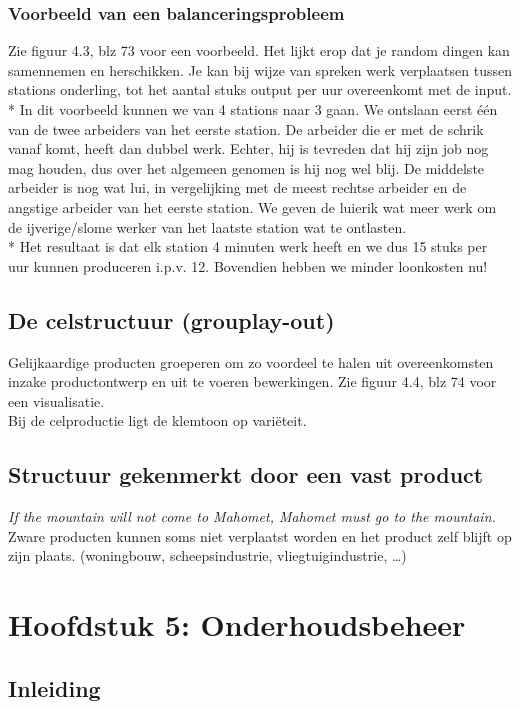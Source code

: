 \documentclass[12pt]{article}
\begin{document}
\subsubsection{Voorbeeld van een balanceringsprobleem}
Zie figuur 4.3, blz 73 voor een voorbeeld. Het lijkt erop dat je random dingen kan samennemen en herschikken. Je kan bij wijze van spreken werk verplaatsen tussen stations onderling, tot het aantal stuks output per uur overeenkomt met de input. \\*
In dit voorbeeld kunnen we van 4 stations naar 3 gaan. We ontslaan eerst \'e\'en van de twee arbeiders van het eerste station. De arbeider die er met de schrik vanaf komt, heeft dan dubbel werk. Echter, hij is tevreden dat hij zijn job nog mag houden, dus over het algemeen genomen is hij nog wel blij. De middelste arbeider is nog wat lui, in vergelijking met de meest rechtse arbeider en de angstige arbeider van het eerste station. We geven de luierik wat meer werk om de ijverige/slome werker van het laatste station wat te ontlasten.\\*
Het resultaat is dat elk station 4 minuten werk heeft en we dus 15 stuks per uur kunnen produceren i.p.v. 12. Bovendien hebben we minder loonkosten nu!
\subsection{De celstructuur (grouplay-out)}
Gelijkaardige producten groeperen om zo voordeel te halen uit overeenkomsten inzake productontwerp en uit te voeren bewerkingen. Zie figuur 4.4, blz 74 voor een visualisatie.\\
Bij de celproductie ligt de klemtoon op vari\"eteit.
\subsection{Structuur gekenmerkt door een vast product}
\textit{If the mountain will not come to Mahomet, Mahomet must go to the mountain.}\\
Zware producten kunnen soms niet verplaatst worden en het product zelf blijft op zijn plaats. (woningbouw, scheepsindustrie, vliegtuigindustrie, \dots)
\clearpage
\section{Hoofdstuk 5: Onderhoudsbeheer}
\subsection{Inleiding}
\end{document}
